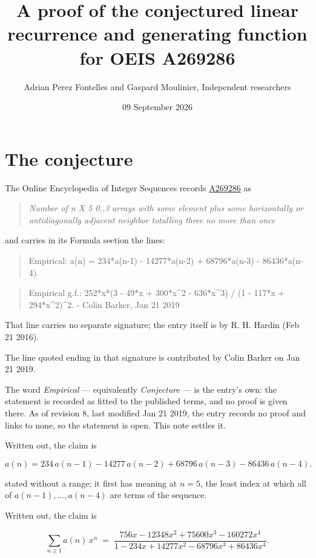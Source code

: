 \documentclass[11pt]{article}
\title{A proof of the conjectured linear recurrence and generating function for OEIS A269286}
\author{Adrian Perez Fontelles and Gaspard Moulinier, Independent researchers}
\date{09 September 2026}
\theoremstyle{definition}
\begin{document}
\maketitle
\section{The conjecture}

The Online Encyclopedia of Integer Sequences records \href{https://oeis.org/A269286}{A269286} as

\begin{quote}\itshape Number of n X 5 0..3 arrays with some element plus some horizontally or antidiagonally adjacent neighbor totalling three no more than once\end{quote}

and carries in its Formula section the lines:

\begin{quote}\ttfamily Empirical: a(n) = 234*a(n-1) - 14277*a(n-2) + 68796*a(n-3) - 86436*a(n-4).\end{quote}

\begin{quote}\ttfamily Empirical g.f.: 252*x*(3 - 49*x + 300*x\textasciicircum{}2 - 636*x\textasciicircum{}3) / (1 - 117*x + 294*x\textasciicircum{}2)\textasciicircum{}2. - Colin Barker, Jan 21 2019\end{quote}

That line carries no separate signature; the entry itself is by R. H. Hardin (Feb 21 2016).

The line quoted ending in that signature is contributed by Colin Barker on Jan 21 2019.

The word {\itshape Empirical} --- equivalently {\itshape Conjecture} --- is the entry's own: the statement is recorded as fitted to the published terms, and no proof is given there. As of revision 8, last modified Jan 21 2019, the entry records no proof and links to none, so the statement is open. This note settles it.

Written out, the claim is

\[a(n) = 234\,a(n-1) - 14277\,a(n-2) + 68796\,a(n-3) - 86436\,a(n-4).\]

stated without a range; it first has meaning at $n = 5$, the least index at which all of $a(n-1),\dots,a(n-4)$ are terms of the sequence.

Written out, the claim is

\[\sum_{n \ge 1} a(n)\,x^n \;=\; \frac{756x - 12348x^{2} + 75600x^{3} - 160272x^{4}}{1 - 234x + 14277x^{2} - 68796x^{3} + 86436x^{4}}.\]
\end{document}
